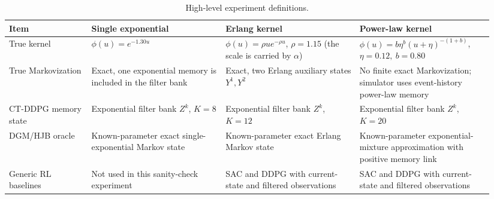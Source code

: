 \documentclass[11pt]{article}
\theoremstyle{remarkitalic}
\theoremstyle{remarkitalic}
\newcommand{\1}{\mathbf 1}
\begin{document}
\begin{table}[h!]
\centering
\caption{High-level experiment definitions.}
\label{tab:experiment_definitions}
\small
\setlength{\tabcolsep}{3pt}
\renewcommand{\arraystretch}{1.12}
\begin{tabular}{@{}L{0.16\linewidth}L{0.26\linewidth}L{0.26\linewidth}L{0.26\linewidth}@{}}
\toprule
Item & Single exponential & Erlang kernel & Power-law kernel \\
\midrule
True kernel &
\(\phi(u)=e^{-1.30u}\) &
\(\phi(u)=\rho u e^{-\rho u}\), \(\rho=1.15\) (the scale is carried by \(\alpha\)) &
\(\phi(u)=b\eta^b(u+\eta)^{-(1+b)}\), \(\eta=0.12,\ b=0.80\) \\
True Markovization &
Exact, one exponential memory is included in the filter bank &
Exact, two Erlang auxiliary states \(Y^1,Y^2\) &
No finite exact Markovization; simulator uses event-history power-law memory \\
CT-DDPG memory state &
Exponential filter bank \(Z^k\), \(K=8\) &
Exponential filter bank \(Z^k\), \(K=12\) &
Exponential filter bank \(Z^k\), \(K=20\) \\
DGM/HJB oracle &
Known-parameter exact single-exponential Markov state &
Known-parameter exact Erlang Markov state &
Known-parameter exponential-mixture approximation with positive memory link \\
Generic RL baselines &
Not used in this sanity-check experiment &
SAC and DDPG with current-state and filtered observations &
SAC and DDPG with current-state and filtered observations \\
\bottomrule
\end{tabular}
\end{table}
\end{document}
